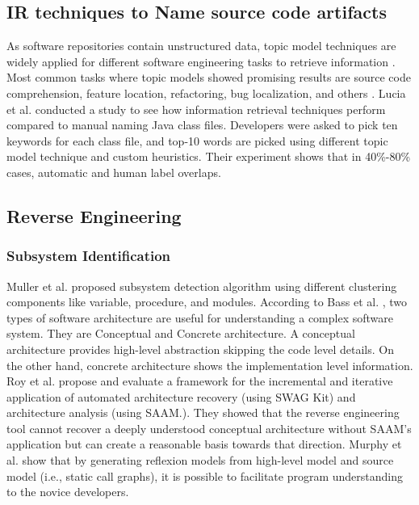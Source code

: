 \subsection{IR techniques to Name source code artifacts}
\label{related:IR}
As software repositories contain unstructured data, topic model techniques are widely applied for different software engineering tasks to retrieve information \cite{chen2016topicMiningRepositories, panichella2013topicModelsTasks, sun2016surveyTopicSE}. Most common tasks where topic models showed promising results are source code comprehension, feature location, refactoring, bug localization, and others \cite{sun2016surveyTopicSE}. Lucia et al. \cite{de2012IRMethodsArtifacts} conducted a study to see how information retrieval techniques perform compared to manual naming Java class files. Developers were asked to pick ten keywords for each class file, and top-10 words are picked using different topic model technique and custom heuristics. Their experiment shows that in 40\%-80\% cases, automatic and human label overlaps. 

\subsection{Reverse Engineering}
\label{related:reverse_engineering}
\subsubsection{Subsystem Identification}
Muller et al. \cite{muller1990composingSubsystemStructures} proposed subsystem detection algorithm using different clustering components like variable, procedure, and modules. 
According to Bass et al. \cite{bass2003softwareArchitecturePractice}, two types of software architecture are useful for understanding a complex software system. They are Conceptual and Concrete architecture. A conceptual architecture provides high-level abstraction skipping the code level details. On the other hand, concrete architecture shows the implementation level information. Roy et al. \cite{roy2008softwareArchitectureRecovery} propose and evaluate a framework for the incremental and iterative application of automated architecture recovery (using SWAG Kit) and architecture analysis (using SAAM.). They showed that the reverse engineering tool cannot recover a deeply understood conceptual architecture without SAAM's application but can create a reasonable basis towards that direction. Murphy et al.\cite{MurphyNotkin2001} show that by generating reflexion models from high-level model and source model (i.e., static call graphs), it is possible to facilitate program understanding to the novice developers. 

